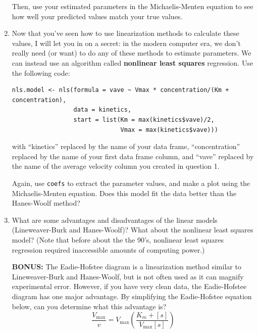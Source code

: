 \documentclass[11pt]{article}
\begin{document}
\begin{enumerate}
Then, use your estimated parameters in the Michaelis-Menten equation to see how well your predicted values match your true values.

\item Now that you've seen how to use linearization methods to calculate these values, I will let you in on a secret: in the modern computer era, we don't really need (or want) to do any of these methods to estimate parameters. We can instead use an algorithm called {\bf nonlinear least squares} regression. Use the following code:
\begin{center}
\begin{verbatim}
nls.model <- nls(formula = vave ~ Vmax * concentration/(Km + concentration), 
                 data = kinetics,
                 start = list(Km = max(kinetics$vave)/2,
                              Vmax = max(kinetics$vave)))
\end{verbatim}
\end{center}

with ``kinetics'' replaced by the name of your data frame, ``concentration'' replaced by the name of your first data frame column, and ``vave'' replaced by the name of the average velocity column you created in question 1. 

Again, use \texttt{coefs} to extract the parameter values, and make a plot using the Michaelis-Menten equation. Does this model fit the data better than the Hanes-Woolf method?

\item What are some advantages and disadvantages of the linear models (Lineweaver-Burk and Hanes-Woolf)? What about the nonlinear least squares model? (Note that before about the the 90's, nonlinear least squares regression required inaccessible amounts of computing power.)

\item[{\bf BONUS:}] The Eadie-Hofstee diagram is a linearization method similar to Lineweaver-Burk and Hanes-Woolf, but is not often used as it can magnify experimental error. However, if you have very clean data, the Eadie-Hofstee diagram has one major advantage. By simplifying the Eadie-Hofstee equation below, can you determine what this advantage is?
	\begin{equation}
	\frac{V_{\mathrm{max}}}{v}=V_{\mathrm{max}}\left( \frac{K_m+[s]}{V_{\mathrm{max}}[s]} \right)
	\end{equation}


\end{enumerate}
\end{document}
